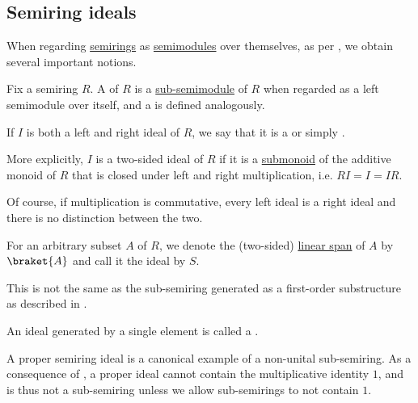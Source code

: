 \subsection{Semiring ideals}\label{subsec:semiring_ideals}

When regarding \hyperref[def:semiring]{semirings} as \hyperref[def:semimodule]{semimodules} over themselves, as per , we obtain several important notions.

\begin{definition}\label{def:semiring_ideal}\mimprovised
  Fix a semiring \( R \). A  of \( R \) is a \hyperref[def:semimodule/submodel]{sub-semimodule} of \( R \) when regarded as a left semimodule over itself, and a  is defined analogously.

  If \( I \) is both a left and right ideal of \( R \), we say that it is a  or simply .

  More explicitly, \( I \) is a two-sided ideal of \( R \) if it is a \hyperref[def:monoid/submodel]{submonoid} of the additive monoid of \( R \) that is closed under left and right multiplication, i.e. \( RI = I = IR \).

  Of course, if multiplication is commutative, every left ideal is a right ideal and there is no distinction between the two.

  \begin{thmenum}
     For an arbitrary subset \( A \) of \( R \), we denote the (two-sided) \hyperref[def:semimodule/submodel]{linear span} of \( A \) by \( \braket{ A } \) and call it the ideal  by \( S \).

    This is not the same as the sub-semiring generated as a first-order substructure as described in .

     An ideal generated by a single element is called a .
  \end{thmenum}
\end{definition}

\begin{remark}\label{rem:semiring_ideal_as_sub_semiring}
  A proper semiring ideal is a canonical example of a non-unital sub-semiring. As a consequence of , a proper ideal cannot contain the multiplicative identity \( 1 \), and is thus not a sub-semiring unless we allow sub-semirings to not contain \( 1 \).
\end{remark}

